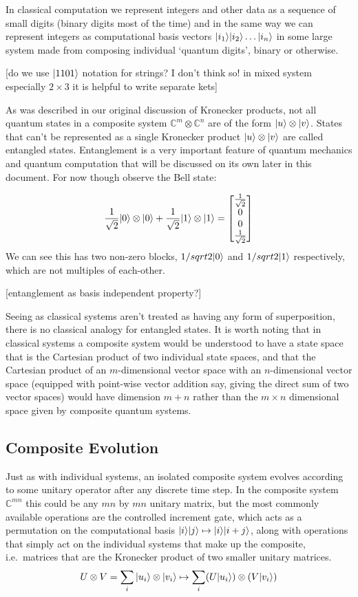 In classical computation we represent integers and other data as a sequence of small digits (binary digits most of the time) and in the same way we can represent integers as computational basis vectors $| i_1 \rangle| i_2 \rangle\dots| i_n \rangle$ in some large system made from composing individual `quantum digits', binary or otherwise.

[do we use $| 1101 \rangle$ notation for strings? I don't think so! in mixed system especially $2 \times 3$ it is helpful to write separate kets]

As was described in our original discussion of Kronecker products, not all quantum states in a composite system $\mathbb{C}^m\otimes\mathbb{C}^n$ are of the form $| u \rangle\otimes| v \rangle$. States that can't be represented as a single Kronecker product $| u \rangle\otimes| v \rangle$ are called entangled states. Entanglement is a very important feature of quantum mechanics and quantum computation that will be discussed on its own later in this document. For now though observe the Bell state:

\[\frac{1}{\sqrt{2}}| 0 \rangle\otimes| 0 \rangle + \frac{1}{\sqrt{2}}| 1 \rangle\otimes| 1 \rangle = \left[\begin{matrix}
\frac{1}{\sqrt{2}}\\
0\\
0\\
\frac{1}{\sqrt{2}}
\end{matrix}\right]\]
We can see this has two non-zero blocks, $1/sqrt{2}| 0 \rangle$ and $1/sqrt{2}| 1 \rangle$ respectively, which are not multiples of each-other.

[entanglement as basis independent property?]

Seeing as classical systems aren't treated as having any form of superposition, there is no classical analogy for entangled states. It is worth noting that in classical systems a composite system would be understood to have a state space that is the Cartesian product of two individual state spaces, and that the Cartesian product of an $m$-dimensional vector space with an $n$-dimensional vector space (equipped with point-wise vector addition say, giving the direct sum of two vector spaces) would have dimension $m+n$ rather than the $m\times n$ dimensional space given by composite quantum systems.
\subsection{Composite Evolution}
Just as with individual systems, an isolated composite system evolves according to some unitary operator after any discrete time step. In the composite system $\mathbb{C}^{mn}$ this could be any $mn$ by $mn$ unitary matrix, but the most commonly available operations are the controlled increment gate, which acts as a permutation on the computational basis $| i \rangle| j \rangle \mapsto | i \rangle| i+j \rangle$, along with operations that simply act on the individual systems that make up the composite, i.e.\ matrices that are the Kronecker product of two smaller unitary matrices.
\[U \otimes V = \sum_i | u_i \rangle\otimes| v_i \rangle \mapsto \sum_i (U| u_i \rangle)\otimes(V| v_i \rangle)\]

